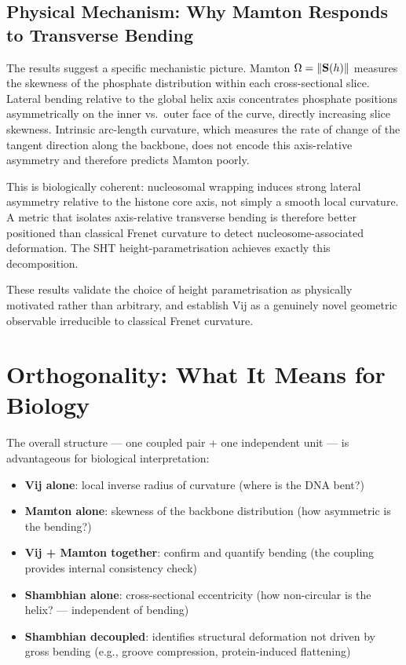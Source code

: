 \subsection{Physical Mechanism: Why Mamton Responds to Transverse Bending}

The results suggest a specific mechanistic picture. Mamton $\Omega = \left\lVert\mathbf{S}(h)\right\rVert$ measures the skewness of the phosphate distribution within each cross-sectional slice. Lateral bending relative to the global helix axis concentrates phosphate positions asymmetrically on the inner vs.~outer face of the curve, directly increasing slice skewness. Intrinsic arc-length curvature, which measures the rate of change of the tangent direction along the backbone, does not encode this axis-relative asymmetry and therefore predicts Mamton poorly.

This is biologically coherent: nucleosomal wrapping induces strong lateral asymmetry relative to the histone core axis, not simply a smooth local curvature. A metric that isolates axis-relative transverse bending is therefore better positioned than classical Frenet curvature to detect nucleosome-associated deformation. The SHT height-parametrisation achieves exactly this decomposition.

These results validate the choice of height parametrisation as physically motivated rather than arbitrary, and establish Vij as a genuinely novel geometric observable irreducible to classical Frenet curvature.

\section{Orthogonality: What It Means for Biology}

The overall structure --- one coupled pair + one independent unit --- is advantageous for biological interpretation:

\begin{itemize}
    \item \textbf{Vij alone}: local inverse radius of curvature (where is the DNA bent?)
    \item \textbf{Mamton alone}: skewness of the backbone distribution (how asymmetric is the bending?)
    \item \textbf{Vij + Mamton together}: confirm and quantify bending (the coupling provides internal consistency check)
    \item \textbf{Shambhian alone}: cross-sectional eccentricity (how non-circular is the helix? --- independent of bending)
    \item \textbf{Shambhian decoupled}: identifies structural deformation not driven by gross bending (e.g., groove compression, protein-induced flattening)
\end{itemize}

